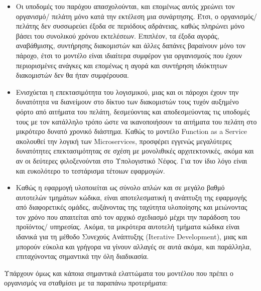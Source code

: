 \documentclass{article}
\begin{document}
\begin{itemize}
\item Οι υποδομές του παρόχου απασχολούνται, και επομένως αυτός χρεώνει τον οργανισμό/ πελάτη μόνο κατά την εκτέλεση μια συνάρτησης. Έτσι, ο οργανισμός/ πελάτης δεν συσσωρεύει έξοδα σε περιόδους αδράνειας, καθώς πληρώνει μόνο βάσει του συνολικού χρόνου εκτελέσεων. Επιπλέον, τα έξοδα αγοράς, αναβάθμισης, συντήρησης διακομιστών και άλλες δαπάνες βαραίνουν μόνο τον πάροχο, έτσι το μοντέλο είναι ιδιαίτερα συμφέρον για οργανισμούς που έχουν περιορισμένες ανάγκες και επομένως η αγορά και συντήρηση ιδιόκτητων διακομιστών δεν θα ήταν συμφέρουσα.
\item Ενισχύεται η επεκτασιμότητα του λογισμικού, μιας και οι πάροχοι έχουν την δυνατότητα να διανείμουν στο δίκτυο των διακομιστών τους τυχόν αυξημένο φόρτο από αιτήματα του πελάτη, δεσμεύοντας και αποδεσμεύοντας τις υποδομές τους με τον κατάλληλο τρόπο ώστε να ικανοποιήσουν τα αιτήματα του πελάτη στο μικρότερο δυνατό χρονικό διάστημα. Καθώς το μοντέλο Function as a Service ακολουθεί την λογική των  Microservices, προσφέρει εγγενώς μεγαλύτερες δυνατότητες επεκτασιμότητας σε σχέση με μονολιθικές αρχιτεκτονικές, ακόμα και αν οι δεύτερες φιλοξενούνται στο Υπολογιστικό Νέφος. Για τον ίδιο λόγο είναι και ευκολότερο το τεστάρισμα τέτοιων εφαρμογών.
\item Καθώς η εφαρμογή υλοποιείται ως σύνολο απλών και σε μεγάλο βαθμό αυτοτελών τμημάτων κώδικα, είναι αποτελεσματική η ανάπτυξη της εφαρμογής από διαφορετικές ομάδες, αυξάνοντας της ταχύτητα υλοποίησης και μειώνοντας τον χρόνο που απαιτείται από τον αρχικό σχεδιασμό μέχρι την παράδοση του προϊόντος/ υπηρεσίας. Ακόμα, τα μικρότερα αυτοτελή τμήματα κώδικα είναι ιδανικά για τη μέθοδο Συνεχούς Ανάπτυξης (Iterative Development), μιας και μπορούν εύκολα και γρήγορα να γίνουν αλλαγές σε αυτά ακόμα, και παράλληλα, επιταχύνοντας σημαντικά την όλη διαδικασία.
\end{itemize}

Υπάρχουν όμως και κάποια σημαντικά ελαττώματα του μοντέλου που πρέπει ο οργανισμός να σταθμίσει με τα παραπάνω προτερήματα:
\end{document}
